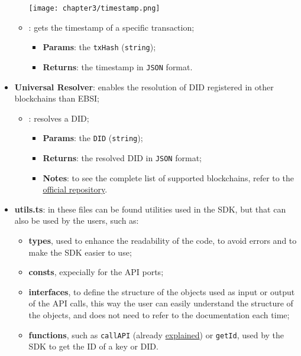 \begin{itemize}
\begin{itemize}
\begin{center}
            \hspace{-1.8cm}
            \texttt{[image: chapter3/timestamp.png]}
            \vspace{-0.3cm}
        \end{center}
        \vspace{0.6cm}
        \item[] : gets the timestamp of a specific transaction;
        \begin{itemize}
            \item \textbf{Params}: the \texttt{txHash} (\texttt{string});
            \item \textbf{Returns}: the timestamp in \texttt{JSON} format.
        \end{itemize}
    \end{itemize}

    \item \textbf{Universal Resolver}: enables the resolution of DID registered in
    other blockchains than EBSI;
    \begin{itemize}
        \item[] : resolves a DID;
        \begin{itemize}
            \item \textbf{Params}: the \texttt{DID} (\texttt{string});
            \item \textbf{Returns}: the resolved DID in \texttt{JSON} format;
            \item \textbf{Notes}: to see the complete list of supported blockchains,
            refer to the \href{https://github.com/decentralized-identity/universal-resolver}
            {official repository}.
        \end{itemize} 
    \end{itemize}

    \item \textbf{utils.ts}: in these files can be found utilities used in the SDK, but that
    can also be used by the users, such as:
    \begin{itemize}
        \item \textbf{types}, used to enhance the readability of the code, to avoid errors and to
        make the SDK easier to use;
        \item \textbf{consts}, expecially for the API ports;
        \item \textbf{interfaces}, to define the structure of the objects used as input or
        output of the API calls, this way the user can easily understand the structure of
        the objects, and does not need to refer to the documentation each time;
        \item \textbf{functions}, such as \texttt{callAPI} (already \hyperref[fig:callAPI]
        {explained}) or \texttt{getId}, used by the SDK to get the ID of a key or DID.
    \end{itemize}
    

\end{itemize}
